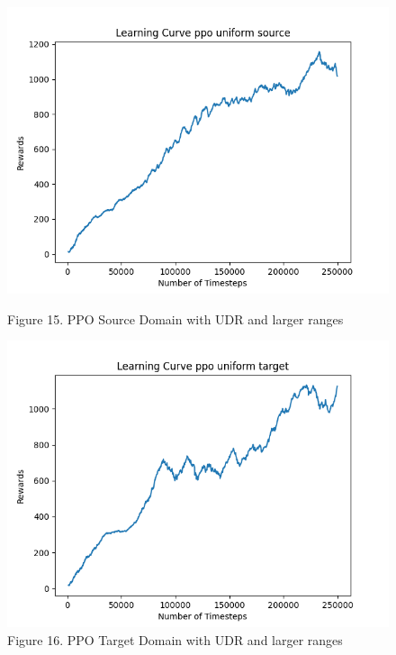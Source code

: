 \documentclass[12pt]{article}
\begin{document}
\begin{figure}[H]
\begin{minipage}{0.45\textwidth}
    \end{minipage}
    \vfill
    \begin{minipage}{0.45\textwidth}
        \centering
        \includegraphics[width=\textwidth]{../images/Learning_Curve_PPO_Uniform_Large_Source.png}
        \caption{Figure 15. PPO Source Domain with UDR and larger ranges}
        \label{fig:ppo_source_udr_larger}
    \end{minipage}
    \hfill
    \begin{minipage}{0.45\textwidth}
        \centering
        \includegraphics[width=\textwidth]{../images/Learning_Curve_PPO_Uniform_Large_Target.png}
        \caption{Figure 16. PPO Target Domain with UDR and larger ranges}
        \label{fig:ppo_target_udr_larger}
    \end{minipage}
\end{figure}
\end{document}
